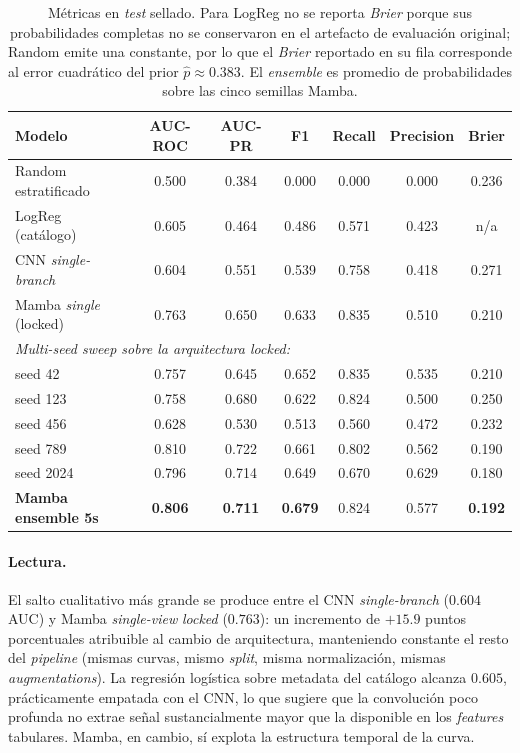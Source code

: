 \documentclass[11pt,a4paper]{article}
\begin{document}
\begin{table}[H]
\centering
\caption{Métricas en \textit{test} sellado. Para LogReg no se reporta
\textit{Brier} porque sus probabilidades completas no se conservaron
en el artefacto de evaluación original; Random emite una constante,
por lo que el \textit{Brier} reportado en su fila corresponde al
error cuadrático del prior $\hat{p} \approx 0.383$. El
\textit{ensemble} es promedio de probabilidades sobre las cinco
semillas Mamba.}
\label{tab:main-results}
\renewcommand{\arraystretch}{1.18}
\begin{tabular}{l c c c c c c}
\toprule
Modelo & AUC-ROC & AUC-PR & F1 & Recall & Precision & Brier \\
\midrule
Random estratificado          & 0.500 & 0.384 & 0.000 & 0.000 & 0.000 & 0.236 \\
LogReg (catálogo)             & 0.605 & 0.464 & 0.486 & 0.571 & 0.423 & n/a \\
CNN \textit{single-branch}    & 0.604 & 0.551 & 0.539 & 0.758 & 0.418 & 0.271 \\
Mamba \textit{single} (locked)& 0.763 & 0.650 & 0.633 & 0.835 & 0.510 & 0.210 \\
\midrule
\multicolumn{7}{l}{\textit{Multi-seed sweep sobre la arquitectura locked:}} \\
\quad seed 42                 & 0.757 & 0.645 & 0.652 & 0.835 & 0.535 & 0.210 \\
\quad seed 123                & 0.758 & 0.680 & 0.622 & 0.824 & 0.500 & 0.250 \\
\quad seed 456                & 0.628 & 0.530 & 0.513 & 0.560 & 0.472 & 0.232 \\
\quad seed 789                & 0.810 & 0.722 & 0.661 & 0.802 & 0.562 & 0.190 \\
\quad seed 2024               & 0.796 & 0.714 & 0.649 & 0.670 & 0.629 & 0.180 \\
\midrule
\textbf{Mamba ensemble 5s}    & \textbf{0.806} & \textbf{0.711} & \textbf{0.679} & 0.824 & 0.577 & \textbf{0.192} \\
\bottomrule
\end{tabular}
\end{table}

\paragraph{Lectura.}
El salto cualitativo más grande se produce entre el CNN
\textit{single-branch} ($0.604$ AUC) y Mamba \textit{single-view}
\textit{locked} ($0.763$): un incremento de $+15.9$ puntos
porcentuales atribuible al cambio de arquitectura, manteniendo
constante el resto del \textit{pipeline} (mismas curvas, mismo
\textit{split}, misma normalización, mismas \textit{augmentations}).
La regresión logística sobre metadata del catálogo alcanza $0.605$,
prácticamente empatada con el CNN, lo que sugiere que la convolución
poco profunda no extrae señal sustancialmente mayor que la disponible
en los \textit{features} tabulares. Mamba, en cambio, sí explota la
estructura temporal de la curva.
\end{document}
